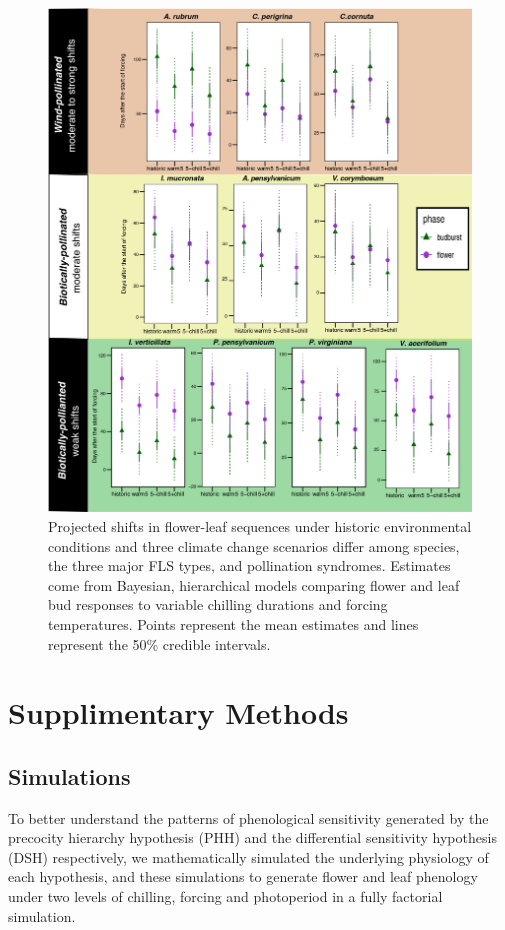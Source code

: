 \documentclass{article}\usepackage[]{graphicx}\usepackage[]{color}
\begin{document}
 \begin{figure}[!ht]
    \centering
 \includegraphics[width=\textwidth]{..//Plots/Flobuds_manuscript_figs/climpredictions.jpg}
    \caption{Projected shifts in flower-leaf sequences under historic environmental conditions and three climate change scenarios differ among species, the three major FLS types, and pollination syndromes. Estimates come from Bayesian, hierarchical models comparing flower and leaf bud responses to variable chilling durations and forcing temperatures. Points represent the mean estimates and lines represent the 50\% credible intervals.}
    \label{fig:preddy_sp}
\end{figure}

\pagebreak[4]

\section*{Supplimentary Methods}
\subsection*{Simulations}
\noident To better understand the patterns of phenological sensitivity generated by the precocity hierarchy hypothesis (PHH) and the differential sensitivity hypothesis (DSH) respectively, we mathematically simulated the underlying physiology of each hypothesis, and these simulations to generate flower and leaf phenology under two levels of chilling, forcing and photoperiod in a fully factorial simulation.\\
\end{document}
